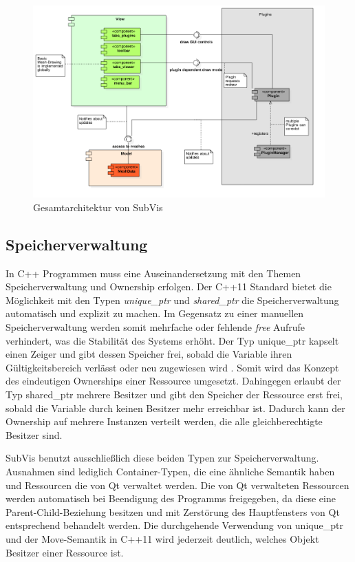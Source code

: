 \begin{figure}
  \centering
  \includegraphics[width=\textwidth]{content/media/subvis_architektur.png}
  \caption{Gesamtarchitektur von SubVis}
  \label{fig:subvis_architektur}
\end{figure}


\subsection{Speicherverwaltung}

In C++ Programmen muss eine Auseinandersetzung mit den Themen Speicherverwaltung und Ownership erfolgen.
Der C++11 Standard bietet die Möglichkeit mit den Typen \emph{unique\_ptr} und \emph{shared\_ptr} die Speicherverwaltung automatisch und explizit zu machen.
Im Gegensatz zu einer manuellen Speicherverwaltung werden somit mehrfache oder fehlende \emph{free} Aufrufe verhindert, was die Stabilität des Systems erhöht.
Der Typ unique\_ptr kapselt einen Zeiger und gibt dessen Speicher frei, sobald die Variable ihren Gültigkeitsbereich verlässt oder neu zugewiesen wird \cite{C++Ref}. 
Somit wird das Konzept des eindeutigen Ownerships einer Ressource umgesetzt.
Dahingegen erlaubt der Typ shared\_ptr mehrere Besitzer und gibt den Speicher der Ressource erst frei, sobald die Variable durch keinen Besitzer mehr erreichbar ist.
Dadurch kann der Ownership auf mehrere Instanzen verteilt werden, die alle gleichberechtigte Besitzer sind.

SubVis benutzt ausschließlich diese beiden Typen zur Speicherverwaltung.
Ausnahmen sind lediglich Container-Typen, die eine ähnliche Semantik haben und Ressourcen die von Qt verwaltet werden.
Die von Qt verwalteten Ressourcen werden automatisch bei Beendigung des Programms freigegeben, da diese eine Parent-Child-Beziehung besitzen und mit Zerstörung des Hauptfensters von Qt entsprechend behandelt werden.
Die durchgehende Verwendung von unique\_ptr und der Move-Semantik in C++11 wird jederzeit deutlich, welches Objekt Besitzer einer Ressource ist.

